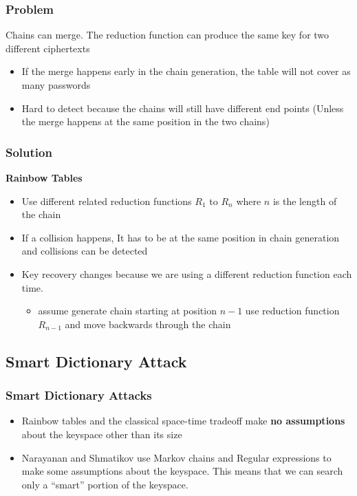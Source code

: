 \documentclass{beamer}
\begin{document}
\begin{frame}
\frametitle{Problem}
Chains can merge. The reduction function can produce the same key for two different ciphertexts
\begin{itemize}
\item If the merge happens early in the chain generation, the table will not cover as many passwords
\item Hard to detect because the chains will still have different end points (Unless the merge happens at the same position in the two chains)
\end{itemize}
\end{frame}

\begin{frame}
\frametitle{Solution}
\textbf{Rainbow Tables}
\begin{itemize}
\item Use different related reduction functions $R_1$ to $R_n$ where $n$ is the length of the chain
\item If a collision happens, It has to be at the same position in chain generation and collisions can be detected
\item Key recovery changes because we are using a different reduction function each time.
\begin{itemize}
\item assume generate chain starting at position $n-1$ use reduction function $R_{n-1}$ and move backwards through the chain
\end{itemize}
\end{itemize}
\end{frame}

\subsection{Smart Dictionary Attack}
\begin{frame}
\frametitle{Smart Dictionary Attacks}
\begin{itemize}
\item Rainbow tables and the classical space-time tradeoff make \textbf{no assumptions} about the keyspace other than its size
\item Narayanan and Shmatikov use Markov chains and Regular expressions to make some assumptions about the keyspace. This means that we can search only a ``smart'' portion of the keyspace.
\end{itemize}
\end{frame}

\end{document}
